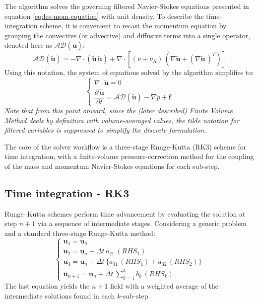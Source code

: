 \documentclass[12pt, a4paper, twoside, openright]{book}
\begin{document}
The algorithm solves the governing filtered Navier-Stokes equations presented in equation \eqref{eq:les-mom-equation} with unit density. To describe the time-integration scheme, it is convenient to recast the momentum equation by grouping the convective (or advective) and diffusive terms into a single operator, denoted here as $\mathcal{AD}(\bm{\widetilde{u}})$:
\begin{equation}
    \label{eq:AD-def}
    \mathcal{AD}(\bm{\widetilde{u}}) = - \nabla \cdot \left( \bm{\widetilde{u}} \, \bm{\widetilde{u}} \right)+ \nabla \cdot \left[ (\nu + \nu_{R}) \, \left(\nabla \bm{\widetilde{u}} + \left( \nabla \bm{\widetilde{u}} \, \right)^T \right) \right]
\end{equation}
Using this notation, the system of equations solved by the algorithm simplifies to:
\begin{equation}
\label{eq:LES-AD}
\begin{cases}
    \nabla \cdot \bm{\widetilde{u}} = 0 \\[1.5ex]
    \dfrac{\partial \, \bm{\widetilde{u}}}{\partial t} = \mathcal{AD}(\bm{\widetilde{u}}) - \nabla \widetilde{p} + \bm{f}
\end{cases}
\end{equation}
\textit{Note that from this point onward, since the (later described) Finite Volume Method deals by definition with volume-averaged values, the tilde notation for filtered variables is suppressed to simplify the discrete formulation.}

The core of the solver workflow is a three-stage Runge-Kutta (RK3) scheme for time integration, with a finite-volume pressure-correction method for the coupling of the mass and momentum Navier-Stokes equations for each sub-step.

\subsection{Time integration - RK3}
Runge–Kutta schemes perform time advancement by evaluating the solution at step $n+1$ via a sequence of intermediate stages. Considering a generic problem and a standard three-stage Runge-Kutta method:
\begin{equation}
\label{eq:RK3-standard}
\begin{cases}
    \bm{u}_1 = \bm{u}_n \\[1.5ex]
    
    \bm{u}_2 = \bm{u}_n + \Delta t \, a_{21} \, \left( RHS_1 \right) \\[1.5ex]
    
    \bm{u}_3 = \bm{u}_n + \Delta t \, \{ a_{31} \, \left( RHS_1 \right) + a_{32} \, \left( RHS_2 \right) \} \\[1.5ex]
    
    \bm{u}_{n+1} = \bm{u}_n + \Delta t \, \sum_{k=1}^{3} b_k \, \left( RHS_k \right)
\end{cases}
\end{equation}
The last equation yields the $n+1$ field with a weighted average of the intermediate solutions found in each $k$-sub-step.
\end{document}
